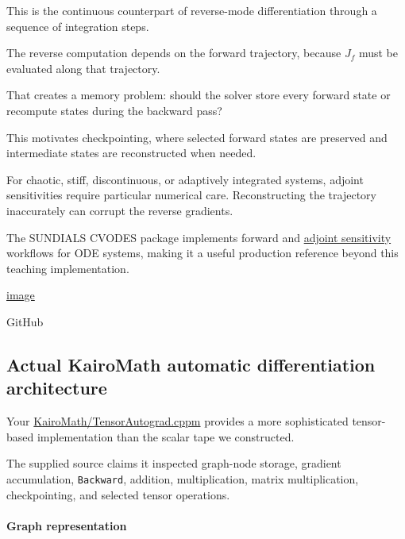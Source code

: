 This is the continuous counterpart of reverse-mode differentiation through a sequence of integration steps.

The reverse computation depends on the forward trajectory, because \(J_f\) must be evaluated along that trajectory.

That creates a memory problem: should the solver store every forward state or recompute states during the backward pass?

This motivates checkpointing, where selected forward states are preserved and intermediate states are reconstructed when needed.

For chaotic, stiff, discontinuous, or adaptively integrated systems, adjoint sensitivities require particular numerical care. Reconstructing the trajectory inaccurately can corrupt the reverse gradients.

The SUNDIALS CVODES package implements forward and \hyperref[02-foundations-ii-ch022-numerical-differentiation-and-automatic-differentiation]{adjoint sensitivity} workflows for ODE systems, making it a useful production reference beyond this teaching implementation. 

\href{https://www.google.com/s2/favicons?domain=https://github.com&sz=32}{image}

GitHub

\subsection{Actual KairoMath automatic differentiation architecture}\label{02-foundations-ii-ch022-actual-kairomath-automatic-differentiation-architecture}

\hypertarget{02-foundations-ii-ch022-actual-kairomath-automatic-differentiation-architecture}{}

Your \href{https://github.com/swayam8624/KairoMath/blob/master/TensorAutograd.cppm?utm_source=chatgpt.com}{KairoMath/TensorAutograd.cppm} provides a more sophisticated tensor-based implementation than the scalar tape we constructed.

The supplied source claims it inspected graph-node storage, gradient accumulation, \texttt{Backward}, addition, multiplication, matrix multiplication, checkpointing, and selected tensor operations.

\paragraph{Graph representation}\label{02-foundations-ii-ch022-graph-representation}

